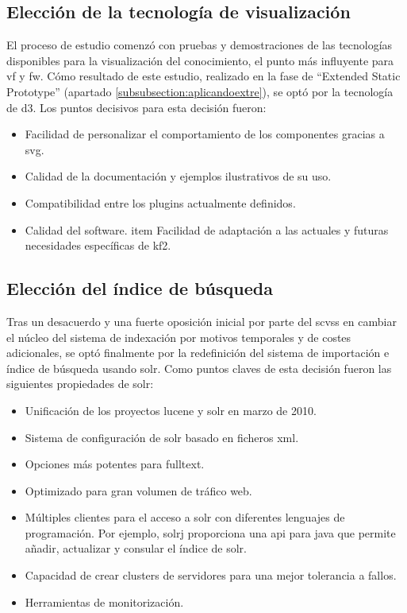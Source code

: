 \subsection{Elección de la tecnología de visualización}

El proceso de estudio comenzó con pruebas y demostraciones de las tecnologías disponibles para la visualización del conocimiento, el punto más influyente para  \gls{vf} y \gls{fw}. Cómo resultado de este estudio, realizado en la fase de ``Extended Static Prototype'' (apartado \ref{subsubsection:aplicandoextre}), se optó por la tecnología de \gls{d3}. Los puntos decisivos para esta decisión fueron:

\begin{itemize}
    \item Facilidad de personalizar el comportamiento de los componentes gracias a \gls{svg}.
    \item Calidad de la documentación y ejemplos ilustrativos de su uso.
    \item Compatibilidad entre los \glspl{plugin} actualmente definidos.
    \item Calidad del \gls{software}. 
    item  Facilidad de adaptación a las actuales y futuras necesidades específicas de \gls{kf2}.
\end{itemize}

\subsection{Elección del índice de búsqueda}

Tras un desacuerdo y una fuerte oposición inicial por parte del \gls{scvss} en cambiar el núcleo del sistema de indexación por motivos temporales y de costes adicionales,
se optó finalmente por la redefinición del sistema de importación e índice de búsqueda usando \gls{solr}. Como puntos claves de esta decisión fueron las siguientes propiedades de \gls{solr}:

\begin{itemize}
    \item Unificación de los proyectos \gls{lucene} y \gls{solr} en marzo de 2010.
    \item Sistema de configuración de \gls{solr} basado en ficheros \gls{xml}.
	\item Opciones más potentes para \gls{fulltext}.
    \item Optimizado para gran volumen de tráfico web.
    \item Múltiples clientes para el acceso a \gls{solr} con diferentes lenguajes de programación. Por ejemplo, \gls{solrj} proporciona una \gls{api} para \gls{java} que permite añadir, actualizar y consular el índice de \gls{solr}.
    \item Capacidad de crear clusters de servidores para una mejor tolerancia a fallos.
    \item Herramientas de monitorización.
\end{itemize}

